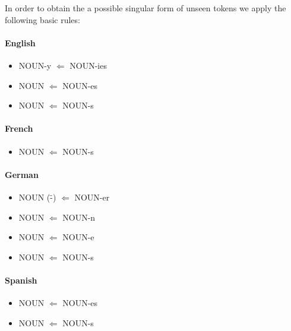 \documentclass[a4paper,11pt]{article}
\begin{document}
	In order to obtain the a possible singular form of unseen tokens we apply the following basic rules:
	
	\renewcommand{\labelitemi}{$\star$}
	\paragraph{English}
	\begin{itemize}
		\itemsep-0.2em 
		\item NOUN-y $\Leftarrow$ NOUN-ies
		\item NOUN $\Leftarrow$ NOUN-es
		\item NOUN $\Leftarrow$ NOUN-s
	\end{itemize}
	
	\paragraph{French}
	\begin{itemize}
		\itemsep-0.2em 
		\item NOUN $\Leftarrow$ NOUN-s
	\end{itemize}
	
	\paragraph{German}
	\begin{itemize}
		\itemsep-0.2em 
		\item NOUN (\"-) $\Leftarrow$ NOUN-er
		\item NOUN $\Leftarrow$ NOUN-n
		\item NOUN $\Leftarrow$ NOUN-e
		\item NOUN $\Leftarrow$ NOUN-s
	\end{itemize}
	
	\paragraph{Spanish}
	\begin{itemize}
		\itemsep-0.2em 
		\item NOUN $\Leftarrow$ NOUN-es
		\item NOUN $\Leftarrow$ NOUN-s
	\end{itemize}
	
\end{document}
